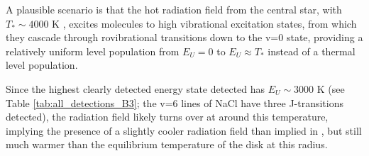 \documentclass[twocolumn]{aastex62}
\begin{document}
A plausible scenario is that the hot radiation field from the central star,
with $T_*\sim4000$ K \citep{Testi2010a}, excites molecules to high vibrational
excitation states, from which they cascade through rovibrational transitions
down to the v=0 state, providing a relatively uniform level population
from $E_U=0$ to $E_U\approx T_*$ instead of a thermal level population.


Since the highest clearly detected energy state detected has $E_U\sim3000$ K
(see Table \ref{tab:all_detections_B3}; the v=6 lines of NaCl have three
J-transitions detected), the radiation field likely turns over at around this
temperature, implying the presence of a slightly cooler radiation field than
implied in \citet{Testi2010a}, but still much warmer than the equilibrium temperature
of the disk at this radius.  

%
\end{document}
